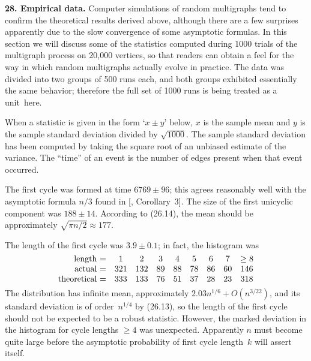 \bigbreak\noindent
{\bf 28. Empirical data.}\enspace
Computer simulations of random multigraphs tend to confirm the theoretical
results derived above, although there are a few surprises apparently
due to the slow convergence of some asymptotic formulas. In this
section we will discuss some of the statistics computed during 1000
trials of the multigraph process on 20,000 vertices, so that readers can
obtain a feel for the way in which random multigraphs actually evolve
in practice. The data was divided into two groups of 500 runs each,
and both groups exhibited essentially the same behavior; therefore the
full set of 1000 runs is being treated as a unit~here.

When a statistic is given in the form `$x\pm y$' below, $x$ is the
sample mean and $y$ is the sample standard deviation divided by $\sqrt{1000}$.
The sample standard deviation has been computed by taking the square root
of an unbiased estimate of the variance. The ``time'' of an event is the
number of edges present when that event occurred.

The first cycle was formed at time $6769\pm96$; this agrees reasonably
well with the asymptotic formula $n/3$ found in [\FKP, Corollary~3].
The size of the first unicyclic component was $188\pm14$. 
According to (26.14), the mean should be approximately $\sqrt{\pi
n/2}\approx 177$.

The length of the first cycle was $3.9\pm0.1$; in fact, the histogram was
$$
\vcenter{\halign{\hfil#\ =&&\quad\hfil$#$\hfil\cr
length&1&2&3&4&5&6&7&\ge8\cr
actual&321&132&89&88&78&86&60&146\cr
theoretical&333&133&76&51&37&28&23&318\cr}}$$
The distribution has infinite mean, approximately $2.03 n^{1/6}+O(n^{3/22})$,
and its standard deviation is of order~$n^{1/4}$ by (26.13), so the
length of the first cycle should not be expected to be a robust statistic.
However, the marked deviation in the histogram for cycle lengths $\ge4$
was unexpected. Apparently $n$ must become quite large before the
asymptotic probability of first cycle length~$k$ will assert itself.

